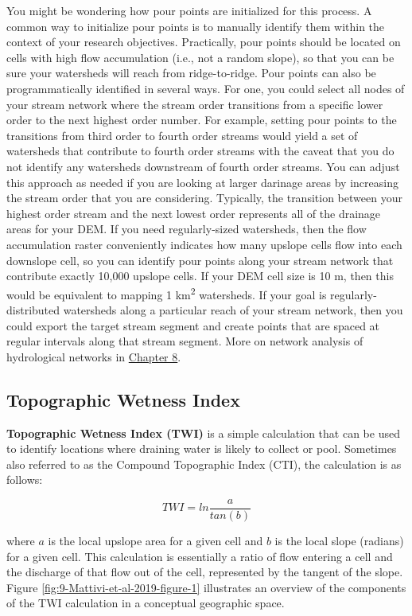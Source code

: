 \documentclass[
]{book}
\begin{document}
You might be wondering how pour points are initialized for this process. A common way to initialize pour points is to manually identify them within the context of your research objectives. Practically, pour points should be located on cells with high flow accumulation (i.e., not a random slope), so that you can be sure your watersheds will reach from ridge-to-ridge. Pour points can also be programmatically identified in several ways. For one, you could select all nodes of your stream network where the stream order transitions from a specific lower order to the next highest order number. For example, setting pour points to the transitions from third order to fourth order streams would yield a set of watersheds that contribute to fourth order streams with the caveat that you do not identify any watersheds downstream of fourth order streams. You can adjust this approach as needed if you are looking at larger darinage areas by increasing the stream order that you are considering. Typically, the transition between your highest order stream and the next lowest order represents all of the drainage areas for your DEM. If you need regularly-sized watersheds, then the flow accumulation raster conveniently indicates how many upslope cells flow into each downslope cell, so you can identify pour points along your stream network that contribute exactly 10,000 upslope cells. If your DEM cell size is 10 m, then this would be equivalent to mapping 1 km\textsuperscript{2} watersheds. If your goal is regularly-distributed watersheds along a particular reach of your stream network, then you could export the target stream segment and create points that are spaced at regular intervals along that stream segment. More on network analysis of hydrological networks in \href{https://ubc-geomatics-textbook.github.io/geomatics-textbook/network-analysis.html}{Chapter 8}.

\hypertarget{topographic-wetness-index}{%
\subsection{Topographic Wetness Index}\label{topographic-wetness-index}}

\textbf{Topographic Wetness Index (TWI)} is a simple calculation that can be used to identify locations where draining water is likely to collect or pool. Sometimes also referred to as the Compound Topographic Index (CTI), the calculation is as follows:

\[
TWI=ln\frac{a}{tan(b)}
\]

where \(a\) is the local upslope area for a given cell and \(b\) is the local slope (radians) for a given cell. This calculation is essentially a ratio of flow entering a cell and the discharge of that flow out of the cell, represented by the tangent of the slope. Figure \ref{fig:9-Mattivi-et-al-2019-figure-1} illustrates an overview of the components of the TWI calculation in a conceptual geographic space.
\end{document}
